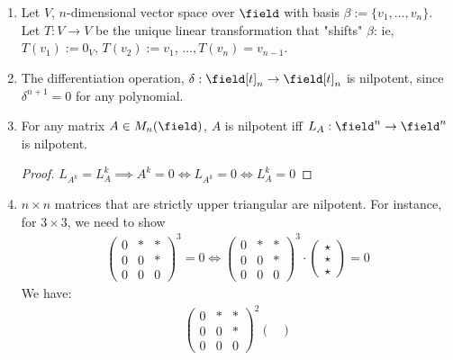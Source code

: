 \begin{example}
    \begin{enumerate}
        \item Let $V$, $n$-dimensional vector space over $\field$ with basis $\beta := \{v_1, \dots, v_n\}$. Let $T: V \to V$ be the unique linear transformation that "shifts" $\beta$: ie, $T(v_1) := 0_V$, $T(v_2) := v_1$, $\dots, T(v_n)  = v_{n-1}$.
        \item The differentiation operation, $\delta : \field[t]_n \to \field[t]_n$ is nilpotent, since $\delta^{n+1} = 0$ for any polynomial.
        \item For any matrix $A \in M_{n}(\field)$, $A$ is nilpotent iff $L_A : \field^n \to \field^n$ is nilpotent.
        \begin{proof}
            $L_{A^k} = L_A^k \implies A^k = 0 \iff L_{A^k}= 0 \iff L_{A}^k = 0$
        \end{proof}
        \item $n \times n$ matrices that are strictly upper triangular are nilpotent. For instance, for $3 \times 3$, we need to show
        \begin{align*}
            \begin{pmatrix}
                0 & \ast &\ast\\
                0 & 0 & \ast\\
                0 & 0 & 0
            \end{pmatrix}^3 = 0 \iff \begin{pmatrix}
                0 & \ast &\ast\\
                0 & 0 & \ast\\
                0 & 0 & 0
            \end{pmatrix}^3\cdot \begin{pmatrix}
                \star\\
                \star\\
                \star
            \end{pmatrix} = 0
        \end{align*}
        We have:
        \begin{align*}
            \begin{pmatrix}
                0 & \ast &\ast\\
                0 & 0 & \ast\\
                0 & 0 & 0
            \end{pmatrix}^2 \begin{pmatrix}

\end{pmatrix}
\end{align*}
\end{enumerate}
\end{example}
